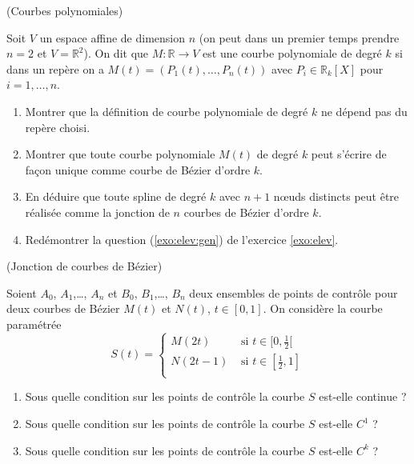 \documentclass[a4paper,12pt,reqno]{amsart}
\begin{document}
\begin{exo} (Courbes polynomiales)

    Soit $V$ un espace affine de dimension $n$ (on peut dans un premier temps prendre $n=2$ et $V=\mathbb{R}^{2}$). On dit que $M:\mathbb{R} \rightarrow V$ est une courbe polynomiale de degré $k$ si dans un repère on a $M(t) = (P_{1}(t),\ldots,P_{n}(t))$ avec $P_{i} \in \mathbb{R}_{k}[X]$ pour $i=1,\ldots,n$.

  \begin{enumerate}

    \item Montrer que la définition de courbe polynomiale de degré $k$ ne dépend pas du repère choisi.

    \item Montrer que toute courbe polynomiale $M(t)$ de degré $k$ peut s'écrire de façon unique comme courbe de Bézier d'ordre $k$.

    \item En déduire que toute spline de degré $k$ avec $n+1$ nœuds distincts peut être réalisée comme la jonction de $n$ courbes de Bézier d'ordre $k$.

    \item Redémontrer la question (\ref{exo:elev:gen}) de l'exercice \ref{exo:elev}.

  \end{enumerate}
\end{exo}

\begin{exo} (Jonction de courbes de Bézier)

  Soient $A_{0}$, $A_{1}$,\dots, $A_{n}$ et $B_{0}$, $B_{1}$,\dots, $B_{n}$ deux ensembles de points de contrôle pour deux courbes de Bézier $M(t)$ et $N(t)$, $t \in [0,1]$. On considère la courbe paramétrée
  $$
    S(t) =
      \begin{cases}
        M(2t) & \text{ si } t \in [0,\frac12[ \\
        N(2t-1) & \text{ si } t \in [\frac12,1] \\
      \end{cases}
  $$
  \begin{enumerate}
    \item Sous quelle condition sur les points de contrôle la courbe $S$ est-elle continue ?

    \item Sous quelle condition sur les points de contrôle la courbe $S$ est-elle $C^{1}$ ?

    \item Sous quelle condition sur les points de contrôle la courbe $S$ est-elle $C^{k}$ ?
  \end{enumerate}

\end{exo}
\end{document}
